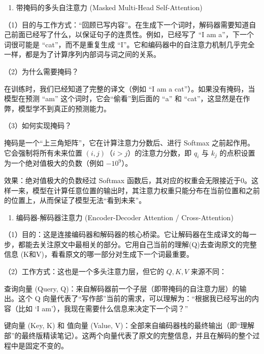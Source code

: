 \begin{enumerate}
\def\labelenumi{\arabic{enumi}.}
\tightlist
\item
  带掩码的多头自注意力 (Masked Multi-Head Self-Attention)
\end{enumerate}

（1）目的与工作方式：``回顾已写内容''。在生成下一个词时，解码器需要知道自己前面已经写了什么，以保证句子的连贯性。例如，已经写了 ``I am a''，下一个词很可能是 ``cat''，而不是重复生成 ``I''。它和编码器中的自注意力机制几乎完全一样，都是为了计算序列内部词与词之间的关系。

（2）为什么需要掩码？

在训练时，我们已经知道了完整的译文（例如 ``I am a cat''）。如果没有掩码，当模型在预测 ``am'' 这个词时，它会``偷看''到后面的 ``a'' 和 ``cat''，这显然是在作弊，模型学不到真正的预测能力。

（3）如何实现掩码？

掩码是一个``上三角矩阵''，它在计算注意力分数后、进行 Softmax 之前起作用。它会强制将所有未来位置 \((i,j)\)（\(i>j\)）的注意力分数，即 \(q_i\) 与 \(k_j\) 的点积设置为一个绝对值极大的负数（例如 \(-10^9\)）。

效果：绝对值极大的负数经过 Softmax 函数后，其对应的权重会无限接近于0。这样一来，模型在计算任意位置的输出时，其注意力权重只能分布在当前位置和之前的位置上，从而保证了模型无法``看到未来''。

\begin{enumerate}
\def\labelenumi{\arabic{enumi}.}
\setcounter{enumi}{1}
\tightlist
\item
  编码器-解码器注意力 (Encoder-Decoder Attention / Cross-Attention)
\end{enumerate}

（1）目的：这是连接编码器和解码器的核心桥梁。它让解码器在生成译文的每一步，都能去关注原文中最相关的部分。它用自己当前的理解(Q)去查询原文的完整信息 (K和V)，看看原文的哪一部分对生成下一个词最重要。

（2）工作方式：这也是一个多头注意力层，但它的 \(Q,K,V\) 来源不同：

查询向量 (Query, Q)：来自解码器前一个子层（即带掩码的自注意力层）的输出。这个 Q 向量代表了``写作部''当前的需求，可以理解为：``根据我已经写出的内容（比如 `I am'），我现在需要什么信息来决定下一个词？''

键向量 (Key, K) 和 值向量 (Value, V)：全部来自编码器栈的最终输出（即``理解部''的最终版精读笔记）。这两个向量代表了原文的完整信息，并且在解码的整个过程中是固定不变的。


